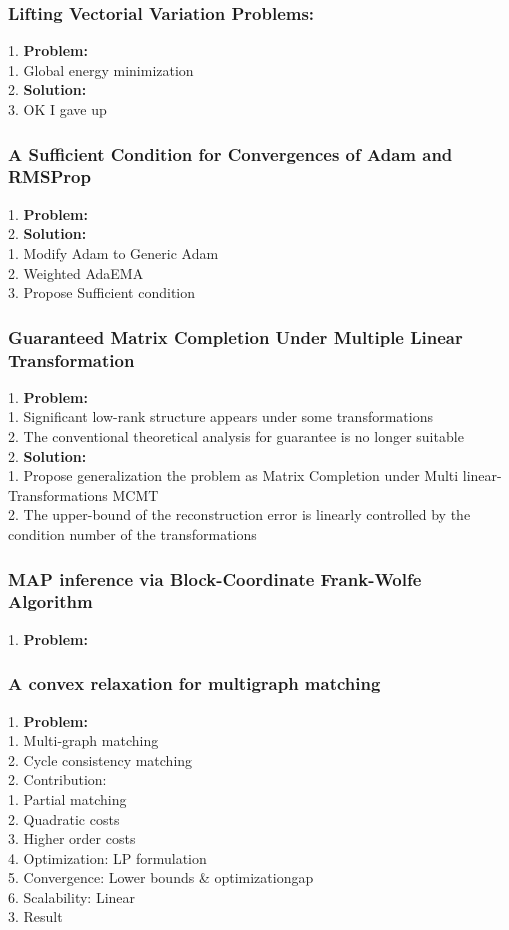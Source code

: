 \subsubsection{Lifting Vectorial Variation Problems:}
    1. {\bf Problem:} \\
        1. Global energy minimization \\
    2. {\bf Solution:} \\
    3. OK I gave up \\
\subsubsection{A Sufficient Condition for Convergences of Adam and RMSProp}
    1. {\bf Problem:} \\
    2. {\bf Solution:} \\
        1. Modify Adam to Generic Adam \\
        2. Weighted AdaEMA \\
        3. Propose Sufficient condition \\
\subsubsection{Guaranteed Matrix Completion Under Multiple Linear Transformation}
    1. {\bf Problem:} \\
        1. Significant low-rank structure appears under some transformations \\
        2. The conventional theoretical analysis for guarantee is no longer suitable \\
    2. {\bf Solution:} \\
        1. Propose generalization the problem as Matrix Completion under Multi linear-Transformations MCMT \\
        2. The upper-bound of the reconstruction error is linearly controlled by the condition number of the transformations \\
\subsubsection{MAP inference via Block-Coordinate Frank-Wolfe Algorithm}
    1. {\bf Problem:} \\
\subsubsection{A convex relaxation for multigraph matching}
    1. {\bf Problem:} \\
        1. Multi-graph matching \\
        2. Cycle consistency matching \\
    2. Contribution: \\
        1. Partial matching \\
        2. Quadratic costs \\
        3. Higher order costs \\
        4. Optimization: LP formulation \\
        5. Convergence: Lower bounds \& optimizationgap \\
        6. Scalability: Linear \\
    3. Result \\
